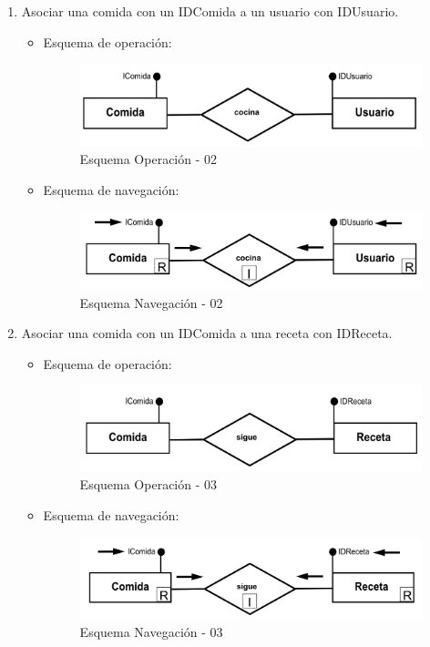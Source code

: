 \documentclass[a4paper,12pt]{report}
\begin{document}
\begin{enumerate}
\item Asociar una comida con un IDComida a un usuario con IDUsuario.
\begin{itemize}
\item Esquema de operación:
\begin{figure}[!htp]
\centering
\includegraphics[width=0.9\linewidth]{./operaciones/img/Comidas/02_ope.png}
\caption{Esquema Operación - 02}
\label{fig:ope02}
\medskip
\footnotesize
{}
\end{figure}
\item Esquema de navegación:
\begin{figure}[!htp]
\centering
\includegraphics[width=0.9\linewidth]{./operaciones/img/Comidas/02_nav.png}
\caption{Esquema Navegación - 02}
\label{fig:nave02}
\medskip
\footnotesize
{}
\end{figure}
\end{itemize}

\item Asociar una comida con un IDComida a una receta con IDReceta.
\begin{itemize}
\item Esquema de operación:
\begin{figure}[!htp]
\centering
\includegraphics[width=0.9\linewidth]{./operaciones/img/Comidas/03_ope.png}
\caption{Esquema Operación - 03}
\label{fig:ope03}
\medskip
\footnotesize
{}
\end{figure}
\item Esquema de navegación:
\begin{figure}[!htp]
\centering
\includegraphics[width=0.9\linewidth]{./operaciones/img/Comidas/03_nav.png}
\caption{Esquema Navegación - 03}
\label{fig:nave03}
\medskip
\footnotesize
{}
\end{figure}
\end{itemize}
\end{enumerate}
\end{document}
